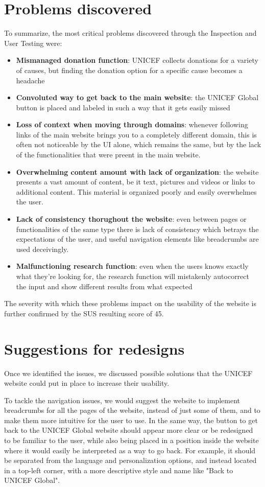 \section{Problems discovered}
To summarize, the most critical problems discovered through the Inspection and User Testing were:
\begin{itemize}
    \item \textbf{Mismanaged donation function}: UNICEF collects donations for a variety of causes, but finding the donation option for a specific cause becomes a headache
    \item \textbf{Convoluted way to get back to the main website}: the UNICEF Global button is placed and labeled in such a way that it gets easily missed
    \item \textbf{Loss of context when moving through domains}: whenever following links of the main website brings you to a completely different domain, this is often not noticeable by the UI alone, which remains the same, but by the lack of the functionalities that were preent in the main website.
    \item \textbf{Overwhelming content amount with lack of organization}: the website presents a vast amount of content, be it text, pictures and videos or links to additional content. This material is organized poorly and easily overwhelmes the user.
    \item \textbf{Lack of consistency thorughout the website}: even between pages or functionalities of the same type there is lack of consistency which betrays the expectations of the user, and useful navigation elements like breadcrumbs are used deceivingly.
    \item \textbf{Malfunctioning research function}: even when the users knows exactly what they're looking for, the research function will mistakenly autocorrect the input and show different results from what expected
\end{itemize}

The severity with which these problems impact on the usability of the website is further confirmed by the SUS resulting score of 45.

\section{Suggestions for redesigns}
Once we identified the issues, we discussed possible solutions that the UNICEF website could put in place to increase their usability.

To tackle the navigation issues, we would suggest the website to implement breadcrumbs for all the pages of the website, instead of just some of them, and to make them more intuitive for the user to use. In the same way, the button to get back to the UNICEF Global website should appear more clear or
be redesigned to be familiar to the user, while also being placed in a position inside the website where it would easily be interpreted as a way to go back. For example, it should be separated from the language and personalization options, and instead located in a top-left corner, with a more descriptive style and name like "Back to UNICEF Global".

